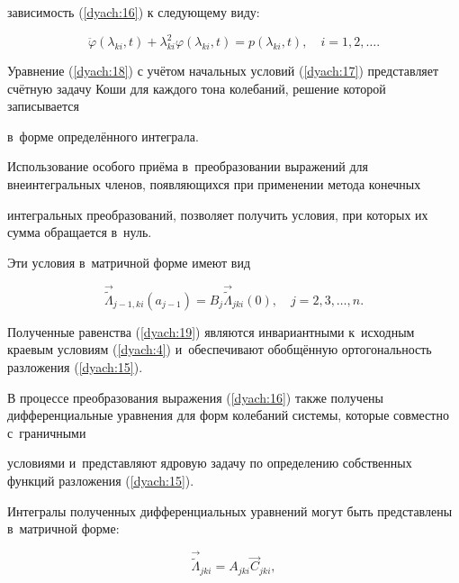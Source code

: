 зависимость (\ref{dyach:16}) к следующему виду:



\begin{equation}

\label{dyach:18}

\ddot{\varphi}(\lambda_{ki}, t)+\lambda^2_{ki}\varphi(\lambda_{ki}, t) = p(\lambda_{ki}, t), \quad i=1, 2, \ldots.

\end{equation}



Уравнение (\ref{dyach:18}) с учётом начальных условий (\ref{dyach:17}) представляет счётную задачу Коши для каждого тона колебаний, решение которой записывается

в~форме определённого интеграла.



Использование особого приёма в~преобразовании выражений для внеинтегральных членов, появляющихся  при применении метода конечных

интегральных преобразований, позволяет получить условия, при которых их сумма обращается в~нуль.

Эти условия в~матричной форме имеют вид

\begin{equation}

\label{dyach:19}

\vec{\widetilde{\Lambda}}_{j-1,ki}(a_{j-1})=B_j\vec{\widetilde{\Lambda}}_{jki}(0), \quad j=2, 3, \ldots, n.

\end{equation}

Полученные равенства (\ref{dyach:19}) являются инвариантными к~исходным краевым условиям (\ref{dyach:4}) и~обеспечивают обобщённую ортогональность разложения (\ref{dyach:15}).



В процессе преобразования выражения (\ref{dyach:16}) также получены дифференциальные уравнения для форм колебаний системы, которые совместно с~граничными

условиями и~представляют ядровую задачу по определению собственных функций разложения (\ref{dyach:15}).

Интегралы полученных дифференциальных уравнений могут быть представлены в~матричной форме:

\begin{equation}

\label{dyach:20}

\vec{\widetilde{\Lambda}}_{jki} = A_{jki}\vec{C}_{jki},

\end{equation}

